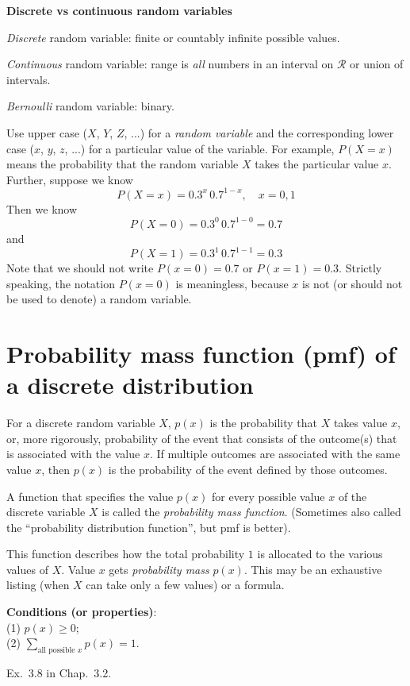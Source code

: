 \documentclass[12pt]{article}
\begin{document}
{\large\textbf{Discrete vs continuous random variables}}

\emph{Discrete} random variable: finite or countably infinite possible
values.

\emph{Continuous} random variable: range is \emph{all} numbers in an
interval on $\mathcal{R}$ or union of intervals.

\example \emph{Bernoulli} random variable: binary.

\alert[Notation]%
Use upper case
($X$, $Y$, $Z$, ...) for a \emph{random variable}
and the corresponding lower case ($x$, $y$, $z$, ...)
for a particular value of the variable.
For example,
$P(X = x)$ means the probability that the random variable $X$ takes
the particular value $x$.
Further, suppose we know
\[
    P(X = x) = 0.3^{x}\, 0.7^{1-x},\quad x = 0,1
\]
Then we know
\[ P(X = 0) = 0.3^0\, 0.7^{1-0} = 0.7\]
and
\[ P(X = 1) = 0.3^1\, 0.7^{1-1} = 0.3\]
Note that we should not write
$P(x = 0) = 0.7$ or $P(x = 1) = 0.3$.
Strictly speaking, the notation $P(x=0)$ is meaningless,
because $x$ is not (or should not be used to denote)
a random variable.


\section{Probability mass function (pmf) of a discrete distribution}

For a discrete random variable $X$,
$p(x)$ is the probability that $X$ takes value $x$,
or, more rigorously, probability of the event that consists
of the outcome(s) that is associated with the value $x$.
If multiple outcomes are associated with the same value $x$,
then $p(x)$ is the probability of the event defined by those outcomes.

A function that specifies the value $p(x)$ for every possible value $x$ of
the discrete variable $X$ is called the
\emph{probability mass function}.
(Sometimes also called the ``probability distribution function'',
but pmf is better).

This function describes how the total probability $1$ is allocated to
the various values of $X$.
Value $x$ gets \emph{probability mass} $p(x)$.
This may be an exhaustive listing (when $X$ can take only a few values)
or a formula.

\textbf{Conditions (or properties)}:\\
(1) $p(x) \ge 0$;\\
(2) $\sum_{\text{all possible $x$}} p(x) = 1$.

\example
Ex.~3.8 in Chap.~3.2.
\end{document}
